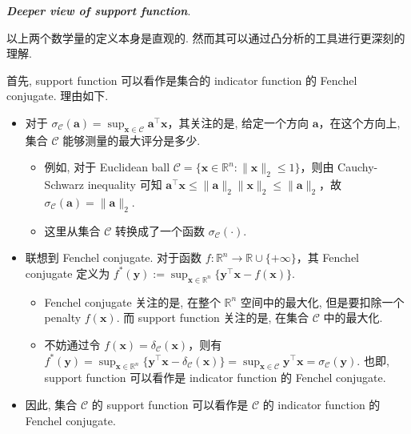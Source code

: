 \documentclass[11pt,UTF8,scheme=plain,fontset=fandol,linespread=1.3]{ctexart}
\numberwithin{figure}{section}
\begin{document}
\emph{\textbf{Deeper view of support function}}.

以上两个数学量的定义本身是直观的. 然而其可以通过凸分析的工具进行更深刻的理解.

首先, support function 可以看作是集合的 indicator function 的 Fenchel conjugate. 理由如下.

\begin{itemize}
\item {}对于 $\sigma_{\mathcal{C}}(\bm{a}) = \sup_{\bm{x} \in \mathcal{C}} \bm{a}^\top \bm{x}$，其关注的是, 给定一个方向 $\bm{a}$，在这个方向上, 集合 $\mathcal{C}$ 能够测量的最大评分是多少.

\begin{itemize}
\item {}例如, 对于 Euclidean ball $\mathcal{C} = \{\bm{x} \in \mathbb{R}^n: \|\bm{x}\|_2 \leq 1\}$，则由 Cauchy-Schwarz inequality 可知 $\bm{a}^\top \bm{x} \leq \|\bm{a}\|_2 \|\bm{x}\|_2 \leq \|\bm{a}\|_2$，故 $\sigma_{\mathcal{C}}(\bm{a}) = \|\bm{a}\|_2$.


\item {}这里从集合 $\mathcal{C}$ 转换成了一个函数 $\sigma_{\mathcal{C}}(\cdot)$.


\end{itemize}


\item {}联想到 Fenchel conjugate. 对于函数 $f: \mathbb{R}^n \to \mathbb{R} \cup \{+\infty\}$，其 Fenchel conjugate 定义为 $f^*(\bm{y}) := \sup_{\bm{x} \in \mathbb{R}^n} \{\bm{y}^\top \bm{x} - f(\bm{x})\}$.

\begin{itemize}
\item {}Fenchel conjugate 关注的是, 在整个 $\mathbb{R}^n$ 空间中的最大化, 但是要扣除一个 penalty $f(\bm{x})$. 而 support function 关注的是, 在集合 $\mathcal{C}$ 中的最大化.


\item {}不妨通过令 $f(\bm{x}) = \delta_{\mathcal{C}}(\bm{x})$，则有 $f^*(\bm{y}) = \sup_{\bm{x} \in \mathbb{R}^n} \{\bm{y}^\top \bm{x} - \delta_{\mathcal{C}}(\bm{x})\} = \sup_{\bm{x} \in \mathcal{C}} \bm{y}^\top \bm{x} = \sigma_{\mathcal{C}}(\bm{y})$. 也即, support function 可以看作是 indicator function 的 Fenchel conjugate.


\end{itemize}


\item {}因此, 集合 $\mathcal{C}$ 的 support function 可以看作是 $\mathcal{C}$ 的 indicator function 的 Fenchel conjugate.


\end{itemize}
\end{document}

